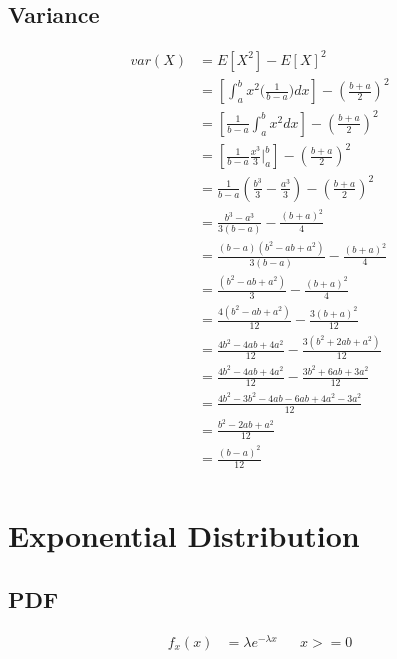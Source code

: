 \documentclass[]{book}
\begin{document}
\subsection{Variance}
\begin{align*}
var(X) &= E[X^2] - E[X]^2\\
&= [\int_{a}^{b} {x^2\big( \frac{1}{b-a} \big)dx}] - (\frac{b+a}{2})^2\\
&= [\frac{1}{b-a}\int_{a}^{b} {x^2dx}] - (\frac{b+a}{2})^2\\
&= [\frac{1}{b-a}\frac{x^3}{3}|_{a}^{b}] - (\frac{b+a}{2})^2\\
&= \frac{1}{b-a}(\frac{b^3}{3}-\frac{a^3}{3}) - (\frac{b+a}{2})^2\\
&= \frac{b^3-a^3}{3(b-a)} - \frac{(b+a)^2}{4}\\
&= \frac{(b-a)(b^2-ab+a^2)}{3(b-a)} - \frac{(b+a)^2}{4}\\
&= \frac{(b^2-ab+a^2)}{3} - \frac{(b+a)^2}{4}\\
&= \frac{4(b^2-ab+a^2)}{12} - \frac{3(b+a)^2}{12}\\
&= \frac{4b^2-4ab+4a^2}{12} - \frac{3(b^2+2ab+a^2)}{12}\\
&= \frac{4b^2-4ab+4a^2}{12} - \frac{3b^2+6ab+3a^2}{12}\\
&= \frac{4b^2-3b^2-4ab-6ab+4a^2-3a^2}{12}\\
&= \frac{b^2-2ab+a^2}{12}\\
&= \frac{(b-a)^2}{12}\\
\end{align*}

\pagebreak
\section {Exponential Distribution}

\subsection{PDF}
\begin{align*}
f_x(x) &= \lambda e^{-\lambda x} && x >= 0
\end{align*}
\end{document}
